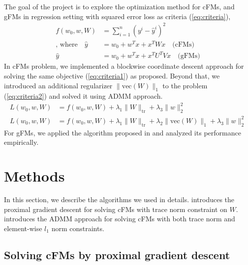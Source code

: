 \documentclass{article}
\newcommand{\tr}{\text{tr}}
\newcommand{\vecc}{\text{vec}}
\begin{document}
The goal of the project is to explore the optimization method for cFMs, and gFMs in regression setting with squared error loss as criteria (\cref{eq:criteria}),
\begin{align}
  f(w_0, w, W) &= \sum_{i = 1}^n (y^i - \hat{y}^i)^2 \label{eq:criteria}\\
  \text{, where} \quad \hat{y} &= w_0 + w^T x + x^T W x \quad\text{(cFMs)} \nonumber\\
  \hat{y} &= w_0 + w^T x + x^T U^TV x \quad\text{(gFMs)} \nonumber
\end{align}
In cFMs problem, we implemented a blockwise coordinate descent approach for solving the same objective (\cref{eq:criteria1}) as \cite{convexFM_paper} proposed. Beyond that, we introduced an additional regularizer $\|\vecc(W)\|_1$ to the problem (\cref{eq:criteria2}) and solved it using ADMM approach. 
\begin{align}
  L(w_0, w, W) &= f(w_0, w, W) + \lambda_1 \|W\|_{\tr} + \lambda_3 \|w\|_2^2 \label{eq:criteria1} \\
  L(w_0, w, W) &= f(w_0, w, W) + \lambda_1 \|W\|_{\tr} + \lambda_2 \|\vecc(W)\|_1 + \lambda_3 \|w\|_2^2 \label{eq:criteria2} 
\end{align}
For gFMs, we applied the algorithm proposed in \cite{generalizedFM_paper} and analyzed its performance empirically.

\section{Methods}

In this section, we describe the algorithms we used in details.  introduces the proximal gradient descent for solving cFMs with trace norm constraint on $W$.  introduces the ADMM approach for solving cFMs with both trace norm and element-wise $l_1$ norm constraints.


\subsection{Solving cFMs by proximal gradient descent} \label{sec:cfm}
\end{document}
